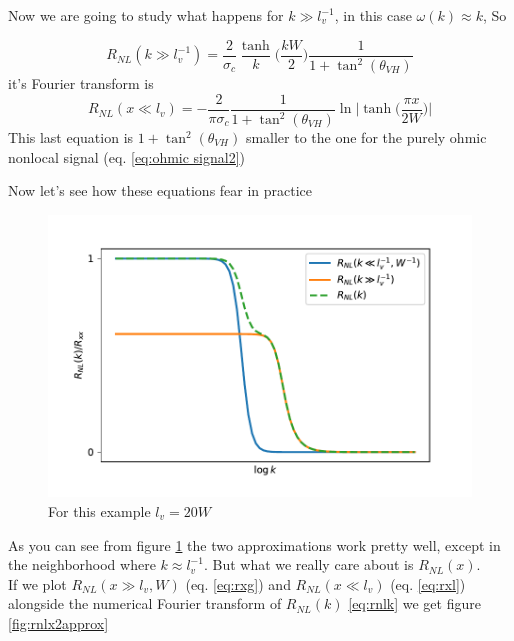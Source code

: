 Now we are going to study what happens for $k\gg l_v^{-1}$, in this case $\omega(k) \approx k$, So

\begin{equation}
    R_{NL}(k\gg l_v^{-1})=\frac 2{\sigma_c}\frac{\tanh}k\bigg(\frac{kW}2\bigg)\frac 1{1+\tan^2(\theta_{VH})}
\end{equation}
it's Fourier transform is
\begin{equation}
    R_{NL}(x\ll l_v)=-\frac 2{\pi\sigma_c}\frac 1{1+\tan^2(\theta_{VH})} \ln\bigg |\tanh \Big(\frac{\pi x}{2W}\Big)\bigg |
\end{equation}
This last equation is $1+\tan^2(\theta_{VH})$ smaller to the one for the purely ohmic nonlocal signal (eq. \ref{eq:ohmic signal2})

Now let's see how these equations fear in practice
\begin{figure}[h!]
    \centering
    \includegraphics[width=\linewidth]{Immagini/rnl/2approx.pdf}
    \caption{For this example $l_v=20W$}
    \label{fig:rnl2approx}
\end{figure}
As you can see from figure \ref{fig:rnl2approx} the two approximations work pretty well, except in the neighborhood where $k\approx l_v^{-1}$. But what we really care about is $R_{NL}(x)$.\\
If we plot $R_{NL}(x\gg l_v,W)$ (eq. \ref{eq:rxg}) and $R_{NL}(x\ll l_v)$ (eq. \ref{eq:rxl}) alongside the numerical Fourier transform of $R_{NL}(k)$ \ref{eq:rnlk} we get figure \ref{fig:rnlx2approx}

